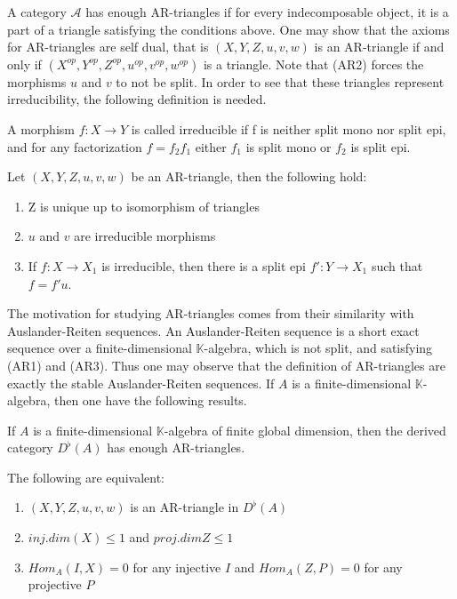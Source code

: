         A category $\mathcal{A}$ has enough AR-triangles if for every indecomposable object, it is a part of a triangle satisfying the conditions above. One may show that the axioms for AR-triangles are self dual, that is $(X,Y,Z,u,v,w)$ is an AR-triangle if and only if $(X^{op},Y^{op},Z^{op},u^{op},v^{op},w^{op})$ is a triangle. Note that (AR2) forces the morphisms $u$ and $v$ to not be split. In order to see that these triangles represent irreducibility, the following definition is needed.

        \begin{definition}
            A morphism $f:X\rightarrow Y$ is called irreducible if f is neither split mono nor split epi, and for any factorization $f=f_2f_1$ either $f_1$ is split mono or $f_2$ is split epi.
        \end{definition}

        \begin{prop}
            Let $(X,Y,Z,u,v,w)$ be an AR-triangle, then the following hold:
            \begin{enumerate}
                \item Z is unique up to isomorphism of triangles
                \item $u$ and $v$ are irreducible morphisms
                \item If $f:X\rightarrow X_1$ is irreducible, then there is a split epi $f':Y\rightarrow X_1$ such that $f=f'u$.
            \end{enumerate}
        \end{prop}

        The motivation for studying AR-triangles comes from their similarity with Auslander-Reiten sequences. An Auslander-Reiten sequence is a short exact sequence over a finite-dimensional $\mathbb{K}$-algebra, which is not split, and satisfying (AR1) and (AR3). Thus one may observe that the definition of AR-triangles are exactly the stable Auslander-Reiten sequences. If $A$ is a finite-dimensional $\mathbb{K}$-algebra, then one have the following results.

        \begin{theorem}
            If $A$ is a finite-dimensional $\mathbb{K}$-algebra of finite global dimension, then the derived category $D^{\flat}(A)$ has enough AR-triangles.
        \end{theorem}

        \begin{prop}
            The following are equivalent:
            \begin{enumerate}
                \item $(X,Y,Z,u,v,w)$ is an AR-triangle in $D^{\flat}(A)$
                \item $inj.dim(X)\leq 1$ and $proj.dim Z \leq 1$
                \item $Hom_A(I,X)=0$ for any injective $I$ and $Hom_A(Z,P)=0$ for any projective $P$
            \end{enumerate}
        \end{prop}
    
